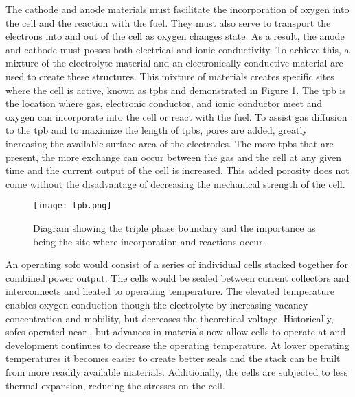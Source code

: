     The cathode and anode materials must facilitate the incorporation of oxygen into the cell and the reaction with the fuel.
    They must also serve to transport the electrons into and out of the cell as oxygen changes state.
    As a result, the anode and cathode must posses both electrical and ionic conductivity.
    To achieve this, a mixture of the electrolyte material and an electronically conductive material are used to create these structures.
    This mixture of materials creates specific sites where the cell is active, known as \glspl{tpb} and demonstrated in Figure \ref{fig:tpb}.
    The \gls{tpb} is the location where gas, electronic conductor, and ionic conductor meet and oxygen can incorporate into the cell or react with the fuel.
    To assist gas diffusion to the \gls{tpb} and to maximize the length of \glspl{tpb}, pores are added, greatly increasing the available surface area of the electrodes.
    The more \glspl{tpb} that are present, the more exchange can occur between the gas and the cell at any given time and the current output of the cell is increased.
    This added porosity does not come without the disadvantage of decreasing the mechanical strength of the cell.\cite{Pihlatie2009,Laurencin2010}
    \begin{figure}
      \centering
      \texttt{[image: tpb.png]}
      \caption[Diagram showing the triple phase boundary and the importance as being the site where incorporation and reactions occur.]{Diagram showing the triple phase boundary and the importance as being the site where incorporation and reactions occur.\cite{Wachsman2011a}}\label{fig:tpb}
    \end{figure}

    An operating \gls{sofc} would consist of a series of individual cells stacked together for combined power output.
    The cells would be sealed between current collectors and interconnects and heated to operating temperature.
    The elevated temperature enables oxygen conduction though the electrolyte by increasing vacancy concentration and mobility, but decreases the theoretical voltage.
    Historically, \glspl{sofc} operated near , but advances in materials now allow cells to operate at  and development continues to decrease the operating temperature.
    At lower operating temperatures it becomes easier to create better seals and the stack can be built from more readily available materials.%
    Additionally, the cells are subjected to less thermal expansion, reducing the stresses on the cell.

